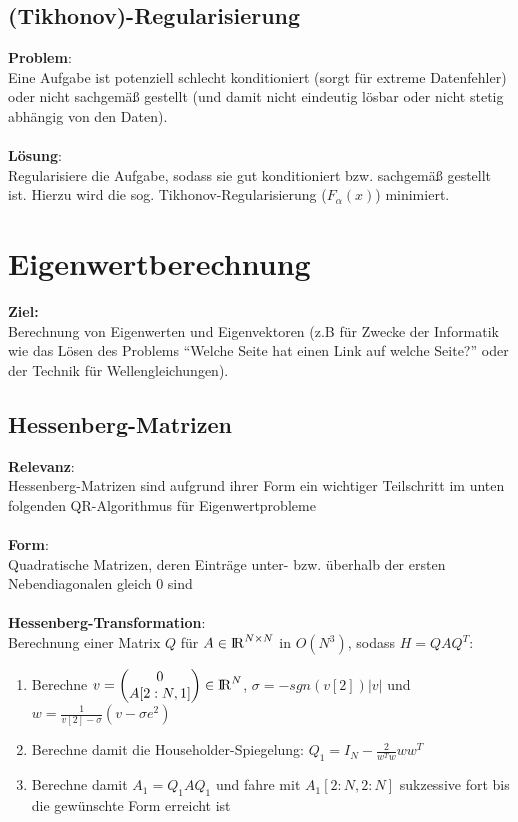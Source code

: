 \documentclass[10pt,a4paper]{article}
\def\realnumbers{{\rm I\!R}}
\newcommand{\quotestyle}[1]{\enquote{#1}}
\begin{document}
	\subsection{(Tikhonov)-Regularisierung}
	\textbf{Problem}:\\Eine Aufgabe ist potenziell schlecht konditioniert (sorgt für extreme Datenfehler) oder nicht sachgemäß gestellt (und damit nicht eindeutig lösbar oder nicht stetig abhängig von den Daten).\\\\
	\textbf{Lösung}:\\Regularisiere die Aufgabe, sodass sie gut konditioniert bzw. sachgemäß gestellt ist. Hierzu wird die sog. Tikhonov-Regularisierung ($F_\alpha(x)$) minimiert.
	
	\newpage
	\section{Eigenwertberechnung}
	\textbf{Ziel:}\\Berechnung von Eigenwerten und Eigenvektoren (z.B für Zwecke der Informatik wie das Lösen des Problems \quotestyle{Welche Seite hat einen Link auf welche Seite?} oder der Technik für Wellengleichungen).

	\subsection{Hessenberg-Matrizen}
	\textbf{Relevanz}:\\Hessenberg-Matrizen sind aufgrund ihrer Form ein wichtiger Teilschritt im unten folgenden QR-Algorithmus für Eigenwertprobleme\\\\
	\textbf{Form}:\\Quadratische Matrizen, deren Einträge unter- bzw. überhalb der ersten Nebendiagonalen gleich $0$ sind\\\\
	\textbf{Hessenberg-Transformation}:\\Berechnung einer Matrix $Q$ für $A \in \realnumbers^{N\times N}$ in $O(N^3)$, sodass $H = QAQ^T$:
	\begin{enumerate}
		\item Berechne $v = \begin{pmatrix}0\\A[2:N,1]\end{pmatrix} \in \realnumbers^N$, $\sigma = -sgn(v[2])|v|$ und $w = \frac{1}{v[2] - \sigma}(v - \sigma e^2)$
		\item Berechne damit die Householder-Spiegelung: $Q_1 = I_N - \frac{2}{w^Tw}ww^T$
		\item Berechne damit $A_1 = Q_1AQ_1$ und fahre mit $A_1[2:N, 2:N]$ sukzessive fort bis die gewünschte Form erreicht ist
	\end{enumerate}
\end{document}
